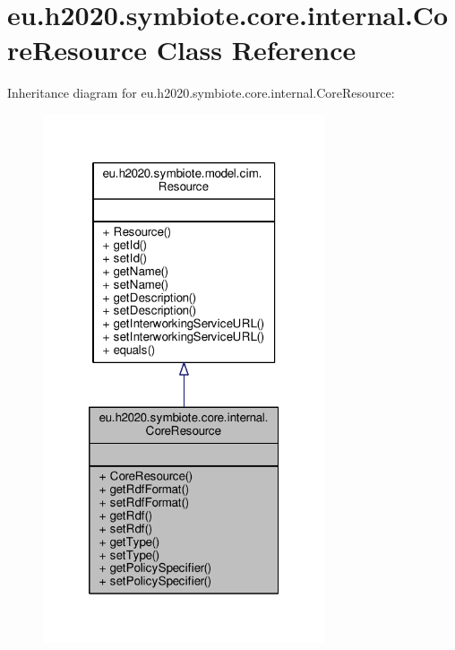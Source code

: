 \hypertarget{classeu_1_1h2020_1_1symbiote_1_1core_1_1internal_1_1CoreResource}{}\section{eu.\+h2020.\+symbiote.\+core.\+internal.\+Core\+Resource Class Reference}
\label{classeu_1_1h2020_1_1symbiote_1_1core_1_1internal_1_1CoreResource}


Inheritance diagram for eu.\+h2020.\+symbiote.\+core.\+internal.\+Core\+Resource\+:
\nopagebreak
\begin{figure}[H]
\begin{center}
\leavevmode
\includegraphics[width=236pt]{classeu_1_1h2020_1_1symbiote_1_1core_1_1internal_1_1CoreResource__inherit__graph}
\end{center}
\end{figure}


